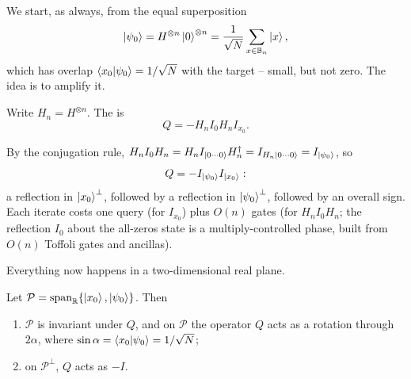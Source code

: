 \documentclass[a4paper]{scrartcl}
\newcommand{\Ps}{\mathcal{P}}
\newcommand{\bits}[1]{\mathbb{B}_{#1}}
\begin{document}
We start, as always, from the equal superposition
$$\ket{\psi_0} = H^{\otimes n}\ket{0}^{\otimes n} = \frac{1}{\sqrt N}\sum_{x\in\bits n}\ket x,$$
which has overlap $\ip{x_0}{\psi_0} = 1/\sqrt N$ with the target -- small, but not zero. The idea is to amplify it.

\begin{definition}
	Write $H_n = H^{\otimes n}$. The  is
	$$Q = -H_nI_0H_nI_{x_0}.$$
\end{definition}

By the conjugation rule, $H_nI_0H_n = H_nI_{\ket{0\cdots0}}H_n^\dagger = I_{H_n\ket{0\cdots0}} = I_{\ket{\psi_0}}$, so
$$Q = -I_{\ket{\psi_0}}I_{\ket{x_0}}:$$
a reflection in $\ket{x_0}^\perp$, followed by a reflection in $\ket{\psi_0}^\perp$, followed by an overall sign. Each iterate costs one query (for $I_{x_0}$) plus $O(n)$ gates (for $H_n I_0 H_n$; the reflection $I_0$ about the all-zeros state is a multiply-controlled phase, built from $O(n)$ Toffoli gates and ancillas).

Everything now happens in a two-dimensional real plane.

\begin{theorem}
	Let $\Ps = \vecspan_\R\{\ket{x_0},\ket{\psi_0}\}$. Then
	\begin{enumerate}[label=(\roman*)]
		\item $\Ps$ is invariant under $Q$, and on $\Ps$ the operator $Q$ acts as a rotation through $2\alpha$, where $\sin\alpha = \ip{x_0}{\psi_0} = 1/\sqrt N$;
		\item on $\Ps^\perp$, $Q$ acts as $-I$.
	\end{enumerate}
\end{theorem}
\end{document}
